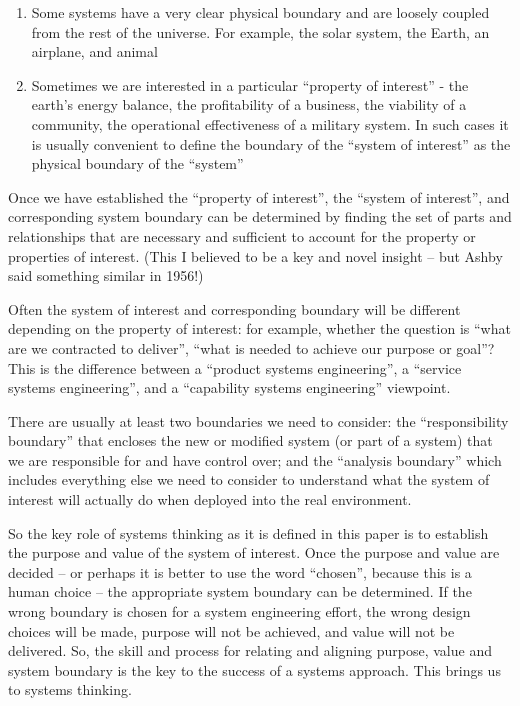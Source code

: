 \begin{enumerate}
\item Some systems have a very clear physical boundary and are loosely coupled from the rest of the universe. For example, the solar system, the Earth, an airplane, and animal
\item Sometimes we are interested in a particular ``property of interest'' - the earth’s energy balance, the profitability of a business, the viability of a community, the operational effectiveness of a military system. In such cases it is usually convenient to define the boundary of the ``system of interest'' as the physical boundary of the ``system''
\end{enumerate}

Once we have established the ``property of interest'', the ``system of interest'', and corresponding system boundary can be determined by finding the set of parts and relationships that are necessary and sufficient to account for the property or properties of interest. (This I believed to be a key and novel insight – but Ashby said something similar in 1956!)

Often the system of interest and corresponding boundary will be different depending on the property of interest: for example, whether the question is ``what are we contracted to deliver'', “what is needed to achieve our purpose or goal”?  This is the difference between a ``product systems engineering'', a ``service systems engineering'', and a ``capability systems engineering'' viewpoint.

There are usually at least two boundaries we need to consider: the ``responsibility boundary'' that encloses the new or modified system (or part of a system) that we are responsible for and have control over; and the ``analysis boundary'' which includes everything else we need to consider to understand what the system of interest will actually do when deployed into the real environment.

So the key role of systems thinking as it is defined in this paper is to establish the purpose and value of the system of interest. Once the purpose and value are decided – or perhaps it is better to use the word “chosen”, because this is a human choice – the appropriate system boundary can be determined. If the wrong boundary is chosen for a system engineering effort, the wrong design choices will be made, purpose will not be achieved, and value will not be delivered. So, the skill and process for relating and aligning purpose, value and system boundary is the key to the success of a systems approach. This brings us to systems thinking.

